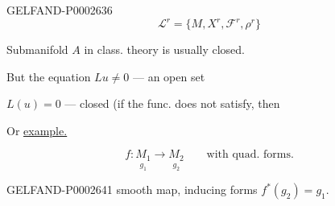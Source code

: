 \begin{GelfandAdjacentEvidence}{GELFAND-P000263}{6}
\begin{equation*}
\mathcal L^r=\{M, X^r,\mathcal F^r,\rho^r\}
\end{equation*}

\end{GelfandAdjacentEvidence}


Submanifold $A$ in class. theory is usually closed.





But the equation $Lu\ne0$ --- an open set





$L (u)=0$ --- closed (if the func. does not satisfy, then







Or \underline{\underline{example.}}





\begin{equation*}
f:\underset{g_1}{M_1}\longrightarrow\underset{g_2}{M_2}\qquad\text{with quad. forms.}
\end{equation*}





\begin{GelfandAdjacentEvidence}{GELFAND-P000264}{1}
smooth map, inducing forms $f^*(g_2)=g_1$.





\end{GelfandAdjacentEvidence}


